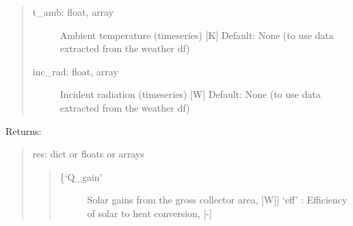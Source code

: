 \documentclass[letterpaper,10pt,english,openany]{sphinxmanual}
\begin{document}
\begin{fulllineitems}
\begin{fulllineitems}
\begin{quote}
\begin{description}
\item[{t\_amb: float, array}] \leavevmode
Ambient temperature (timeseries) {[}K{]}
Default: None (to use data extracted from the weather df)

\item[{inc\_rad: float, array}] \leavevmode
Incident radiation (timeseries) {[}W{]}
Default: None (to use data extracted from the weather df)

\end{description}
\end{quote}

Returns:
\begin{quote}

res: dict or floats or arrays
\begin{quote}
\begin{description}
\item[{\{‘Q\_gain’}] \leavevmode{[}Solar gains from the gross collector area, {[}W{]}{]}
‘eff’ : Efficiency of solar to heat conversion, {[}-{]}

\end{description}
\end{quote}
\end{quote}

\end{fulllineitems}


\begin{fulllineitems}
\label{\detokenize{source/mswh.system:mswh.system.components.Converter.weather}}
\end{fulllineitems}


\end{fulllineitems}

\end{document}
